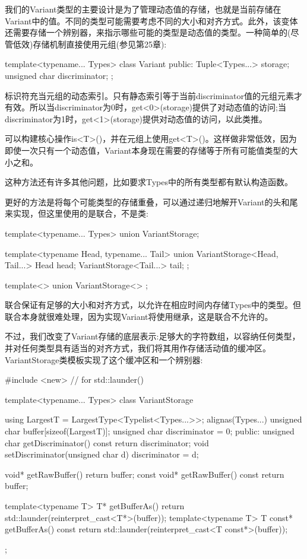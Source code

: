 我们的Variant类型的主要设计是为了管理动态值的存储，也就是当前存储在Variant中的值。不同的类型可能需要考虑不同的大小和对齐方式。此外，该变体还需要存储一个辨别器，来指示哪些可能的类型是动态值的类型。一种简单的(尽管低效)存储机制直接使用元组(参见第25章):

\begin{cpp}
template<typename... Types>
class Variant {
	public:
	Tuple<Types...> storage;
	unsigned char discriminator;
};
\end{cpp}

标识符充当元组的动态索引。只有静态索引等于当前discriminator值的元组元素才有效。所以当discriminator为0时，get<0>(storage)提供了对动态值的访问;当discriminator为1时，get<1>(storage)提供对动态值的访问，以此类推。

可以构建核心操作is<T>()，并在元组上使用get<T>()。这样做非常低效，因为即使一次只有一个动态值，Variant本身现在需要的存储等于所有可能值类型的大小之和。

\begin{notice}这种方法还有许多其他问题，比如要求Types中的所有类型都有默认构造函数。
\end{notice}

更好的方法是将每个可能类型的存储重叠，可以通过递归地解开Variant的头和尾来实现，但这里使用的是联合，不是类:

\begin{cpp}
template<typename... Types>
union VariantStorage;

template<typename Head, typename... Tail>
union VariantStorage<Head, Tail...> {
	Head head;
	VariantStorage<Tail...> tail;
};

template<>
union VariantStorage<> {
};
\end{cpp}

联合保证有足够的大小和对齐方式，以允许在相应时间内存储Types中的类型。但联合本身就很难处理，因为实现Variant将使用继承，这是联合不允许的。

不过，我们改变了Variant存储的底层表示:足够大的字符数组，以容纳任何类型，并对任何类型具有适当的对齐方式，我们将其用作存储活动值的缓冲区。VariantStorage类模板实现了这个缓冲区和一个辨别器:

\begin{cpp}
#include <new> // for std::launder()

template<typename... Types>
class VariantStorage {
	using LargestT = LargestType<Typelist<Types...>>;
	alignas(Types...) unsigned char buffer[sizeof(LargestT)];
	unsigned char discriminator = 0;
	public:
	unsigned char getDiscriminator() const { return discriminator; }
	void setDiscriminator(unsigned char d) { discriminator = d; }
	
	void* getRawBuffer() { return buffer; }
	const void* getRawBuffer() const { return buffer; }
	
	template<typename T>
		T* getBufferAs() { return std::launder(reinterpret_cast<T*>(buffer)); }
	template<typename T>
		T const* getBufferAs() const {
			return std::launder(reinterpret_cast<T const*>(buffer));
		}
};
\end{cpp}

